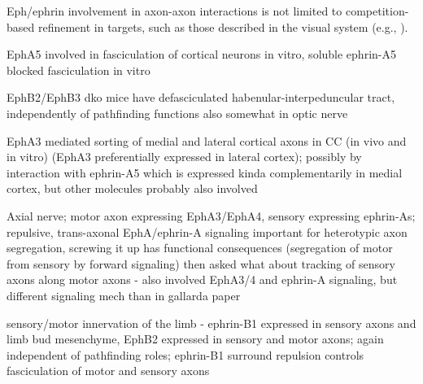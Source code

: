 Eph/ephrin involvement in axon-axon interactions is not limited to competition-based refinement in targets, such as those described in the visual system (e.g., ).


EphA5 involved in fasciculation of cortical neurons in vitro, soluble ephrin-A5 blocked fasciculation in vitro \cite{winslow1995cloning}

EphB2/EphB3 dko mice have defasciculated habenular-interpeduncular tract, independently of pathfinding functions \cite{orioli1996sek4}
also somewhat in optic nerve \cite{birgbauer2000kinase}

EphA3 mediated sorting of medial and lateral cortical axons in CC (in vivo and in vitro) (EphA3 preferentially expressed in lateral cortex); possibly by interaction with ephrin-A5 which is expressed kinda complementarily in medial cortex, but other molecules probably also involved \cite{nishikimi2011segregation}

Axial nerve; motor axon expressing EphA3/EphA4, sensory expressing ephrin-As; repulsive, trans-axonal EphA/ephrin-A signaling important for heterotypic axon segregation, screwing it up has functional consequences (segregation of motor from sensory by forward signaling) \cite{gallarda2008segregation}
then asked what about tracking of sensory axons along motor axons - also involved EphA3/4 and ephrin-A signaling, but different signaling mech than in gallarda paper \cite{wang2011anatomical}

sensory/motor innervation of the limb - ephrin-B1 expressed in sensory axons and limb bud mesenchyme, EphB2 expressed in sensory and motor axons; again independent of pathfinding roles; ephrin-B1 surround repulsion controls fasciculation of motor and sensory axons
\cite{luxey2013eph}


\cite{coate2012otic}

\cite{kaneko2003interaxonal}